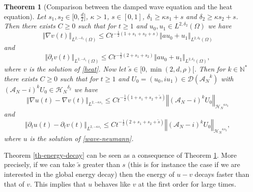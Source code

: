 \documentclass[10pt, a4paper,reqno]{amsart}
\theoremstyle{plain}
\newtheorem{theorem}{{Theorem}}[section]
\theoremstyle{definition}
\theoremstyle{remark}
\begin{document}
\begin{theorem}[Comparison between the damped wave equation and the heat equation] \label{th-chaleur}
Let $s_1,s_2 \in \big[0,\frac d 2]$, ${\kappa} > 1$, $s \in [0,1]$, ${\delta}_1 {\geqslant}  {\kappa} s_1 + s$ and ${\delta}_2 {\geqslant}  {\kappa} s_2 + s$. Then there exists $C {\geqslant} 0$ such that for $t {\geqslant} 1$ and $u_0,u_1 \in L^{2,{\delta}_2}({\Omega})$ we have 
\begin{equation} \label{estim-th-v}
{\left\Vert {\nabla v(t)}\right\Vert}_{L^{2,-{\delta}_1}({\Omega})} {\leqslant} C t^{-\frac 12 (1 + s_1 + s_2 + s)} {\left\Vert {au_0 + u_1}\right\Vert}_{L^{2,{\delta}_2}({\Omega})}
\end{equation}
and 
\begin{equation} \label{estim-th-dv}
{\left\Vert {\partial_t v(t)}\right\Vert}_{L^{2,-{\delta}_1}({\Omega})} {\leqslant} C t^{-\frac 12 (2 + s_1 + s_2)} {\left\Vert {au_0 + u_1}\right\Vert}_{L^{2,{\delta}_2}({\Omega})},
\end{equation}
where $v$ is the solution of \eqref{heat}. Now let $\tilde s \in [0, \min(2,d,\rho)[$. Then for $k \in {\mathbb{N}}^*$ there exists $C {\geqslant} 0$ such that for $t {\geqslant} 1$ and $U_0 = (u_0,iu_1) \in {{\mathcal D}}({{{\mathcal A}}_N}^k)$ with $({{{\mathcal A}}_N}-i)^k U_0 \in {\mathcal H_N}^{{\delta}_2}$ we have 
\begin{equation} \label{estim-th-uv}
{\left\Vert {\nabla u(t) - \nabla v(t)}\right\Vert}_{L^{2,-{\kappa} s_1}} {\leqslant} C t^{-\frac 12 (1 + s_1 + s_2 + \tilde s)} {\left\Vert {({{{\mathcal A}}_N}-i)^k U_0}\right\Vert}_{{\mathcal H_N}^{{\kappa} s_2}}
\end{equation}
and 
\begin{equation} \label{estim-th-duv}
{\left\Vert {\partial_t u(t) - \partial_t v(t)}\right\Vert}_{L^{2,- {\kappa} s_1}} {\leqslant} C t^{-\frac 12 (2 + s_1 + s_2 + \tilde s)} {\left\Vert {({{{\mathcal A}}_N}-i)^k U_0}\right\Vert}_{{\mathcal H_N}^{{\kappa} s_2}},
\end{equation}
where $u$ is the solution of \eqref{wave-neumann}.
\end{theorem}

Theorem \ref{th-energy-decay} can be seen as a consequence of Theorem \ref{th-chaleur}. More precisely, if we can take $\tilde s$ greater than $s$ (this is for instance the case if we are interested in the global energy decay) then the energy of $u-v$ decays faster than that of $v$. This implies that $u$ behaves like $v$ at the first order for large times.
\end{document}
